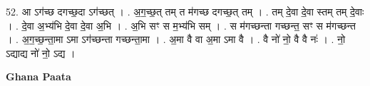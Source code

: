 \documentclass[17pt]{extarticle}
\begin{document}
52. आ ऽग॑च्छ दगच्छ॒दा ऽग॑च्छत् । . अ॒ग॒च्छ॒त् तम् त म॑गच्छ दगच्छ॒त् तम् । . तम् दे॒वा दे॒वा स्तम् तम् दे॒वाः । . दे॒वा अ॒भ्य॑भि दे॒वा दे॒वा अ॒भि । . अ॒भि सꣳ स म॒भ्य॑भि सम् । . स म॑गच्छन्ता गच्छन्त॒ सꣳ स म॑गच्छन्त । . अ॒ग॒च्छ॒न्ता॒मा ऽमा ऽग॑च्छन्ता गच्छन्ता॒मा । . अ॒मा वै वा अ॒मा ऽमा वै । . वै नो॑ नो॒ वै वै नः॑ । . नो॒ ऽद्याद्य नो॑ नो॒ ऽद्य । \newline

\textbf{Ghana Paata } \newline
\end{document}
